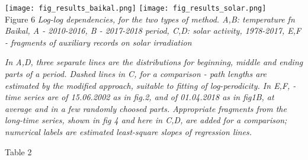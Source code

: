 \documentclass[a4paper]{article}
\begin{document}
\vskip 12pt
\texttt{[image: fig\_results\_baikal.png]}
\texttt{[image: fig\_results\_solar.png]}\\
Figure 6 \textit{Log-log dependencies, for the two types of method. A,B: temperature fn Baikal, A - 2010-2016, B - 2017-2018 period, C,D: solar activity, 1978-2017, E,F - fragments of auxiliary records on solar irradiation}

\textit{\small{In A,D, three separate lines are the distributions for beginning, middle and ending parts of a period. Dashed lines in C, for a comparison - path lengths are estimated by the modified approach,  suitable to fitting of log-perodicity. In E,F, - time series are of 15.06.2002 as in fig.2, and of 01.04.2018 as in fig1B, at average and in a few randomly choosed parts. Appropriate fragments from the long-time series, shown in fig 4 and here in C,D, are added for a comparison; numerical labels are estimated least-square slopes of regression lines.}}

\newpage

Table 2 \textit{}
\end{document}
